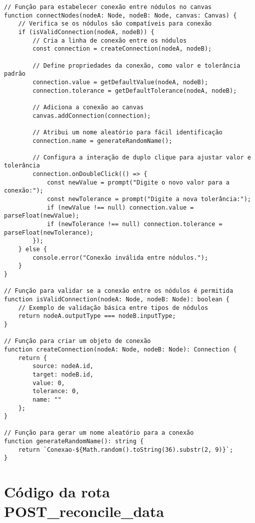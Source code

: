 \begin{verbatim}
// Função para estabelecer conexão entre nódulos no canvas
function connectNodes(nodeA: Node, nodeB: Node, canvas: Canvas) {
    // Verifica se os nódulos são compatíveis para conexão
    if (isValidConnection(nodeA, nodeB)) {
        // Cria a linha de conexão entre os nódulos
        const connection = createConnection(nodeA, nodeB);

        // Define propriedades da conexão, como valor e tolerância padrão
        connection.value = getDefaultValue(nodeA, nodeB);
        connection.tolerance = getDefaultTolerance(nodeA, nodeB);

        // Adiciona a conexão ao canvas
        canvas.addConnection(connection);

        // Atribui um nome aleatório para fácil identificação
        connection.name = generateRandomName();

        // Configura a interação de duplo clique para ajustar valor e tolerância
        connection.onDoubleClick(() => {
            const newValue = prompt("Digite o novo valor para a conexão:");
            const newTolerance = prompt("Digite a nova tolerância:");
            if (newValue !== null) connection.value = parseFloat(newValue);
            if (newTolerance !== null) connection.tolerance = parseFloat(newTolerance);
        });
    } else {
        console.error("Conexão inválida entre nódulos.");
    }
}

// Função para validar se a conexão entre os nódulos é permitida
function isValidConnection(nodeA: Node, nodeB: Node): boolean {
    // Exemplo de validação básica entre tipos de nódulos
    return nodeA.outputType === nodeB.inputType;
}

// Função para criar um objeto de conexão
function createConnection(nodeA: Node, nodeB: Node): Connection {
    return {
        source: nodeA.id,
        target: nodeB.id,
        value: 0,
        tolerance: 0,
        name: ""
    };
}

// Função para gerar um nome aleatório para a conexão
function generateRandomName(): string {
    return `Conexao-${Math.random().toString(36).substr(2, 9)}`;
}
\end{verbatim}

\chapter{Código da rota POST\_reconcile\_data}
\label{Anexo:CodigoFunctionPostReconcileData}


